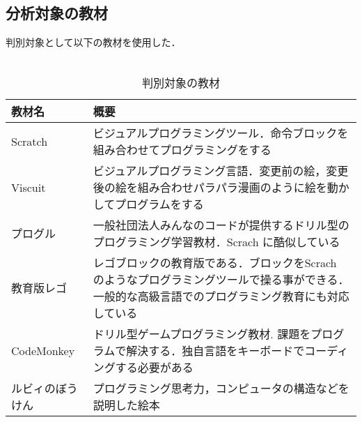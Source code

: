 \subsection{分析対象の教材}
判別対象として以下の教材を使用した．\\\\
\begin{table}[htb]
\begin{center}
    \caption{判別対象の教材}
  \begin{tabularx}{\linewidth}{|X|X|} \hline
    教材名 & 概要 \\ \hline
    Scratch&ビジュアルプログラミングツール．命令ブロックを組み合わせてプログラミングをする \\ \hline
    Viscuit&ビジュアルプログラミング言語．変更前の絵，変更後の絵を組み合わせパラパラ漫画のように絵を動かしてプログラムをする\\ \hline
    プログル\cite{proguru} & 一般社団法人みんなのコードが提供するドリル型のプログラミング学習教材．Scrach に酷似している\\ \hline
    教育版レゴ\cite{lego}&レゴブロックの教育版である．ブロックをScrach のようなプログラミングツールで操る事ができる．一般的な高級言語でのプログラミング教育にも対応している\\ \hline
    CodeMonkey \cite{monkey}&ドリル型ゲームプログラミング教材. 課題をプログラムで解決する．独自言語をキーボードでコーディングする必要がある\\ \hline
    ルビィのぼうけん\cite{ruby} &プログラミング思考力，コンピュータの構造などを説明した絵本\\ \hline
    \end{tabularx}
  \label{tab:bamen1}
  \end{center}
\end{table}

